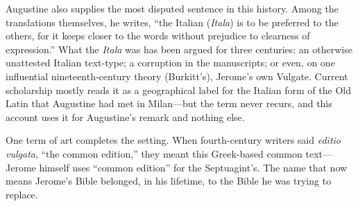 Augustine also supplies the most disputed sentence in this history. Among
the translations themselves, he writes, ``the Italian (\textit{Itala}) is to be
preferred to the others, for it keeps closer to the words without prejudice
to clearness of expression.''
What the \textit{Itala} was has been argued for three centuries: an
otherwise unattested Italian text-type; a corruption in the manuscripts; or
even, on one influential nineteenth-century theory (Burkitt's), Jerome's
own Vulgate. Current scholarship mostly reads it as a geographical label
for the Italian form of the Old Latin that Augustine had met in
Milan---but the term never recurs, and this account uses it for
Augustine's remark and nothing else.

One term of art completes the setting. When fourth-century writers said
\textit{editio vulgata}, ``the common edition,'' they meant this
Greek-based common text---Jerome himself uses ``common edition'' for the
Septuagint's. The name that now means Jerome's Bible belonged, in his
lifetime, to the Bible he was trying to replace.
